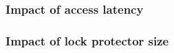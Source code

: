 \documentclass[aspectratio=169]{beamer}
\begin{document}
\begin{frame}
  \frametitle{Impact of access latency}
  \centering
  
\end{frame}
\begin{frame}
  \frametitle{Impact of lock protector size}
  \centering
  
\end{frame}
\end{document}
